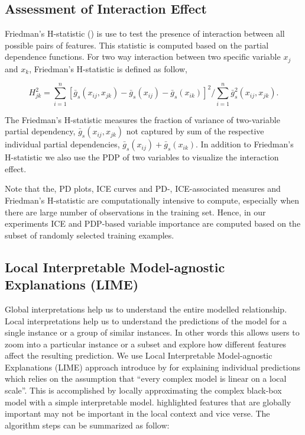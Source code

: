 \documentclass[11pt,a4paper,]{article}
\begin{document}
\subsection{Assessment of Interaction
Effect}\label{assessment-of-interaction-effect}

Friedman's H-statistic (\textcite{friedman2008predictive}) is use to
test the presence of interaction between all possible pairs of features.
This statistic is computed based on the partial dependence functions.
For two way interaction between two specific variable \(x_j\) and
\(x_k\), Friedman's H-statistic is defined as follow,

\[H_{jk}^2=\sum_{i=1}^{n}[\bar{g}_{s}(x_{ij}, x_{jk})-\bar{g}_{s}(x_{ij})-\bar{g}_{s}(x_{ik})]^2/\sum_{i=1}^{n}\bar{g}^2_{s}(x_{ij}, x_{jk}).\]

The Friedman's H-statistic measures the fraction of variance of
two-variable partial dependency, \(\bar{g}_{s}(x_{ij}, x_{jk})\) not
captured by sum of the respective individual partial dependencies,
\(\bar{g}_{s}(x_{ij})+\bar{g}_{s}(x_{ik})\). In addition to Friedman's
H-statistic we also use the PDP of two variables to visualize the
interaction effect.

Note that the, PD plots, ICE curves and PD-, ICE-associated measures and
Friedman's H-statistic are computationally intensive to compute,
especially when there are large number of observations in the training
set. Hence, in our experiments ICE and PDP-based variable importance are
computed based on the subset of randomly selected training examples.

\subsection{Local Interpretable Model-agnostic Explanations
(LIME)}\label{local-interpretable-model-agnostic-explanations-lime}

Global interpretations help us to understand the entire modelled
relationship. Local interpretations help us to understand the
predictions of the model for a single instance or a group of similar
instances. In other words this allows users to zoom into a particular
instance or a subset and explore how different features affect the
resulting prediction. We use Local Interpretable Model-agnostic
Explanations (LIME) approach introduce by \textcite{ribeiro2016should}
for explaining individual predictions which relies on the assumption
that ``every complex model is linear on a local scale''. This is
accomplished by locally approximating the complex black-box model with a
simple interpretable model. \textcite{ribeiro2016should} highlighted
features that are globally important may not be important in the local
context and vice verse. The algorithm steps can be summarized as follow:
\end{document}
